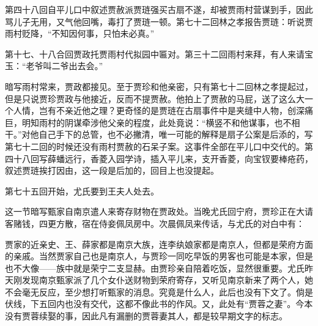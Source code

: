 \par 第四十八回自平儿口中叙述贾赦派贾琏强买古扇不遂，却被贾雨村营谋到手，因此骂儿子无用，又气他回嘴，毒打了贾琏一顿。第七十二回林之孝报告贾琏：听说贾雨村贬降，“不知因何事，只怕未必真。”
\par 第十七、十八合回贾政托贾雨村代拟园中匾对。第三十二回雨村来拜，有人来请宝玉：“老爷叫二爷出去会。”
\par 暗写雨村常来，贾政都接见。至于贾珍和他亲密，只有第七十二回林之孝提起过，但是只说贾珍贾政与他接近，反而不提贾赦。他拍上了贾赦的马屁，送了这么大一个人情，岂有不亲近他之理？更奇怪的是贾琏在古扇事件中是夹缝中人物，创深痛巨，明知雨村的阴谋牵涉他父亲的程度，此处竟说：“横竖不和他谋事，也不相干。”对他自己手下的总管，也不必撇清，唯一可能的解释是扇子公案是后添的，写第七十二回的时候还没有雨村贾赦的石呆子案。这事件全部在平儿口中交代的。第四十八回写薛蟠远行，香菱入园学诗，插入平儿来，支开香菱，向宝钗要棒疮药，叙述贾琏挨打因由，这一段是后加的，回目上也没提起。
\par 第七十五回开始，尤氏要到王夫人处去。
\par 这一节暗写甄家自南京遣人来寄存财物在贾政处。当晚尤氏回宁府，贾珍正在大请客赌钱，四更方散，宿在侍妾佩凤房中。次晨佩凤来传话，与尤氏的对白中有：
\par 贾家的近亲史、王、薛家都是南京大族，连李纨娘家都是南京人，但都是荣府方面的亲戚。当然贾家自己也是南京人，与贾珍一同吃早饭的男客也可能是本家，但是也不大像——族中就是荣宁二支显赫。由贾珍亲自陪着吃饭，显然很重要。尤氏昨天刚发现南京甄家派了几个女仆送财物到荣府寄存，又听见南京新来了两个人，她不会毫无反应，至少想打听甄家的消息。究竟是什么人，此后也没有下文了。倘是伏线，下五回内也没有交代，这都不像此书的作风。又，此处有“贾蓉之妻”。今本没有贾蓉续娶的事，因此凡有漏删的贾蓉妻其人，都是较早期文字的标志。
